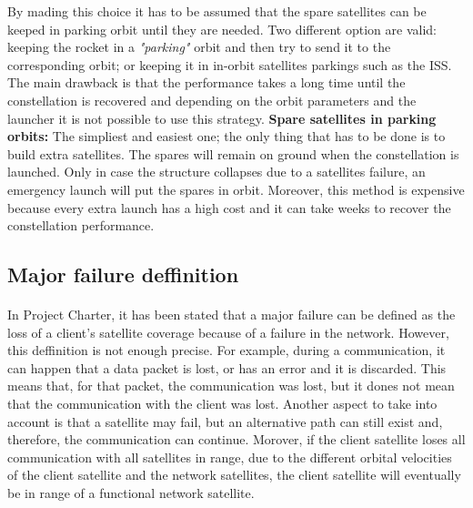 By mading this choice it has to be assumed that the spare satellites can be keeped in parking orbit until they are needed. Two different option are valid: keeping the rocket in a \textit{"parking"} orbit and then try to send it to the corresponding orbit; or keeping it in in-orbit satellites parkings such as the ISS. The main drawback is that the performance takes a long time until the constellation is recovered and depending on the orbit parameters and the launcher it is not possible to use this strategy.  
\newline
\newline
\textbf{Spare satellites in parking orbits:}
\newline
The simpliest and easiest one; the only thing that has to be done is to build extra satellites. The spares will remain on ground when the constellation is launched. Only in case the structure collapses due to a satellites failure, an emergency launch will put the spares in orbit. Moreover, this method is expensive because every extra launch has a high cost and it can take weeks to recover the constellation performance. 
\newline

\subsection{Major failure deffinition}

\paragraph{}In Project Charter, it has been stated that a major failure can be defined as the loss of a client’s satellite coverage because of a failure in the network. However, this deffinition is not enough precise. For example, during a communication, it can happen that a data packet is lost, or has an error and it is discarded. This means that, for that packet, the communication was lost, but it dones not mean that the communication with the client was lost. Another aspect to take into account is that a satellite may fail, but an alternative path can still exist and, therefore, the communication can continue. Morover, if the client satellite loses all communication with all satellites in range, due to the different orbital velocities of the client satellite and the network satellites, the client satellite will eventually be in range of a functional network satellite.

